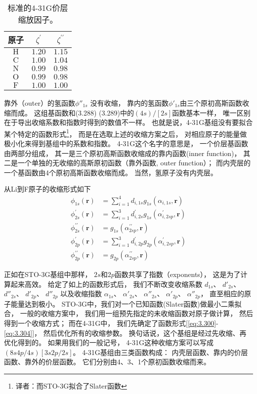 \begin{table}[]
    \centering
    \begin{tabular}{ccc}
    \toprule 
    原子         & $\zeta^{\prime}$ & $\zeta^{\prime \prime}$ \\
    \midrule 
    $\mathrm{H}$ & $1.20$ & $1.15$ \\
    $\mathrm{C}$ & $1.00$ & $1.04$ \\
    $\mathrm{N}$ & $0.99$ & $0.98$ \\
    $\mathrm{O}$ & $0.99$ & $0.98$ \\
    $\mathrm{F}$ & $1.00$ & $1.00$ \\
    \bottomrule
    \end{tabular}
    \caption{标准的4-31G价层缩放因子。}
    \label{tab:3.9}
\end{table}

靠外（outer）的氢函数$\phi''_{1s}$ 没有收缩，
靠内的氢函数$\phi'_{1s}$由三个原初高斯函数收缩而成。
这组基函数和(3.288) (3.289)中的$(4s)/[2s]$函数基本一样，
唯一区别在于导出收缩系数和指数时得到的数值不一样。
也就是说，4-31G基组没有要拟合某个特定的函数形式\footnote{
译者：而STO-3G拟合了Slater函数
}，
而是在选取上述的收缩方案之后，
对相应原子的能量做极小化来得到基组中的系数和指数。
4-31G这个名字的意思是，
一个价层基函数由两部分组成，
其一是三个原初高斯函数收缩成的靠内函数(inner function)，
其二是一个单独的无收缩的高斯原初函数（靠外函数, outer function）；
而内壳层的一个基函数由4个原初高斯函数收缩而成。
当然，氢原子没有内壳层。

从Li到F原子的收缩形式如下
\begin{align}
\phi_{1 s}(\mathbf{r}) & = \sum_{i=1}^4 d_{i, 1 s} g_{1 s}\left(\alpha_{i, 1 s}, \mathbf{r}\right) 
\label{eq:3.300}
\\
\phi_{2 s}^{\prime}(\mathbf{r}) & = \sum_{i=1}^3 d_{i, 2 s}^{\prime} g_{1 s}\left(\alpha_{i, 2 s p}^{\prime}, \mathbf{r}\right) \\
\phi_{2 s}^{\prime \prime}(\mathbf{r}) & = g_{1 s}\left(\alpha_{2 s p}^{\prime \prime}, \mathbf{r}\right) \\
\phi_{2 p}^{\prime}(\mathbf{r}) & = \sum_{i=1}^3 d_{i, 2 p}^{\prime} g_{2 p}\left(\alpha_{i, 2 s p}^{\prime}, \mathbf{r}\right) \\
\phi_{2 p}^{\prime \prime}(\mathbf{r}) & = g_{2 p}\left(\alpha_{2 s p}^{\prime \prime}, \mathbf{r}\right)
\label{eq:3.304}
\end{align}

正如在STO-3G基组中那样，
$2s$和$2p$函数共享了指数（exponents），
这是为了计算起来高效。
给定了如上的函数形式后，
我们不断改变收缩系数
$d_{1s}$、 $d'_{2s}$、 $d''_{2s}$、 $d'_{2p}$、 $d''_{2p}$
以及收缩指数
$\alpha_{1s}$、 $\alpha'_{2s}$、 $\alpha''_{2s}$、 $\alpha'_{2p}$、 $\alpha''_{2p}$，
直至相应的原子能量达到极小。
STO-3G中，我们对一个已知函数(Slater函数)做最小二乘拟合，
一般的收缩方案中，
我们用一组预先指定的未收缩函数对原子做计算，
然后得到一个收缩方式；
而在4-31G中，
我们先确定了函数形式[\eqref{eq:3.300}-\eqref{eq:3.304}]，
然后优化所有的收缩参数。
换句话说，这个基组是经过先收缩、再优化得到的。
如果用我们的一般记号，
4-31G这种收缩方案可以写成$(8s4p/4s)[3s2p/2s]$。
4-31G基组由三类函数构成：
内壳层函数、靠内的价层函数、靠外的价层函数。
它们分别由4、3、1个原初函数收缩而来。

